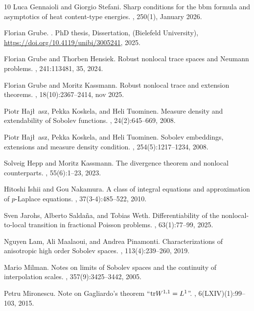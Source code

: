 \documentclass[12pt, reqno]{amsart}%
\theoremstyle{plain}  %
\theoremstyle{definition}  %
\numberwithin{equation}{section}
\begin{document}
{\begin{thebibliography}{10}
Luca Gennaioli and Giorgio Stefani.
\newblock Sharp conditions for the bbm formula and asymptotics of heat
  content-type energies.
, 250(1), January 2026.

Florian Grube.
.
\newblock PhD thesis, Dissertation, (Bielefeld University),
  \url{https://doi.org/10.4119/unibi/3005241}, 2025.

Florian Grube and Thorben Hensiek.
\newblock Robust nonlocal trace spaces and {N}eumann problems.
, 241:113481, 35, 2024.

Florian Grube and Moritz Kassmann.
\newblock Robust nonlocal trace and extension theorems.
, 18(10):2367--2414, nov 2025.

Piotr Haj\l~asz, Pekka Koskela, and Heli Tuominen.
\newblock Measure density and extendability of {S}obolev functions.
, 24(2):645--669, 2008.

Piotr Haj\l~asz, Pekka Koskela, and Heli Tuominen.
\newblock Sobolev embeddings, extensions and measure density condition.
, 254(5):1217--1234, 2008.

Solveig Hepp and Moritz Kassmann.
\newblock The divergence theorem and nonlocal counterparts.
, 55(6):1–23, 2023.

Hitoshi Ishii and Gou Nakamura.
\newblock A class of integral equations and approximation of {$p$}-{L}aplace
  equations.
, 37(3-4):485--522,
  2010.

Sven Jarohs, Alberto Salda{\~n}a, and Tobias Weth.
\newblock Differentiability of the nonlocal-to-local transition in fractional
  {P}oisson problems.
, 63(1):77--99, 2025.

Nguyen Lam, Ali Maalaoui, and Andrea Pinamonti.
\newblock Characterizations of anisotropic high order {S}obolev spaces.
, 113(4):239--260, 2019.

Mario Milman.
\newblock Notes on limits of {S}obolev spaces and the continuity of
  interpolation scales.
, 357(9):3425--3442, 2005.

Petru Mironescu.
\newblock Note on {G}agliardo's theorem ``{${\rm tr}W^{1,1}=L^1$}''.
, 6(LXIV)(1):99--103, 2015.


\end{thebibliography}}
\end{document}
